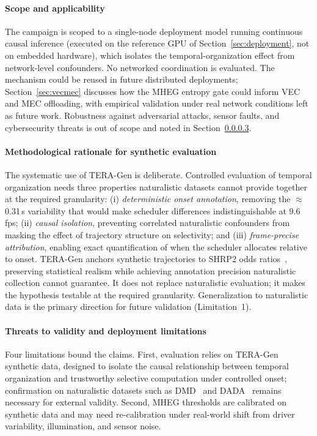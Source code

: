 \documentclass[a4paper,fleqn]{cas-dc}
\newcommand{\TERAGen}{\mbox{TERA-Gen}\xspace}
\newcommand{\MHEG}{\mbox{MHEG}\xspace}
\begin{document}
\paragraph{Scope and applicability}
\label{sec:scope}
The campaign is scoped to a single-node deployment model running continuous
causal inference {\color{\revcolor}(executed on the reference GPU of
Section~\ref{sec:deployment}, not on embedded hardware)}, which isolates the temporal-organization effect from network-level
confounders. No networked coordination is evaluated. The mechanism could be
reused in future distributed deployments; Section~\ref{sec:vecmec} discusses how
the \MHEG entropy gate could inform VEC and MEC offloading, with empirical
validation under real network conditions left as future work. Robustness against
adversarial attacks, sensor faults, and cybersecurity threats is out of scope
and noted in Section~\ref{sec:limitations}.
\paragraph{Methodological rationale for synthetic evaluation}
The systematic use of \TERAGen is deliberate. Controlled evaluation of temporal
organization needs three properties naturalistic datasets cannot provide
together at the required granularity: (i) \emph{deterministic onset annotation},
removing the $\approx$0.31\,s variability that would make scheduler differences
indistinguishable at 9.6\,fps; (ii) \emph{causal isolation}, preventing
correlated naturalistic confounders from masking the effect of trajectory
structure on selectivity; and (iii) \emph{frame-precise attribution}, enabling
exact quantification of when the scheduler allocates relative to onset. \TERAGen
anchors synthetic trajectories to SHRP2 odds ratios~\cite{dingus2016shrp2},
preserving statistical realism while achieving annotation precision naturalistic
collection cannot guarantee. It does not replace naturalistic evaluation; it
makes the hypothesis testable at the required granularity. Generalization to
naturalistic data is the primary direction for future validation (Limitation~1).
\paragraph{Threats to validity and deployment limitations}
\label{sec:limitations}
Four limitations bound the claims. First, evaluation relies on \TERAGen
synthetic data, designed to isolate the causal relationship between temporal
organization and trustworthy selective computation under controlled onset;
confirmation on naturalistic datasets such as DMD~\cite{ortega2020dmd} and
DADA~\cite{fang2022dada} remains necessary for external validity. Second, \MHEG
thresholds are calibrated on synthetic data and may need re-calibration under
real-world shift from driver variability, illumination, and sensor noise.
\end{document}
